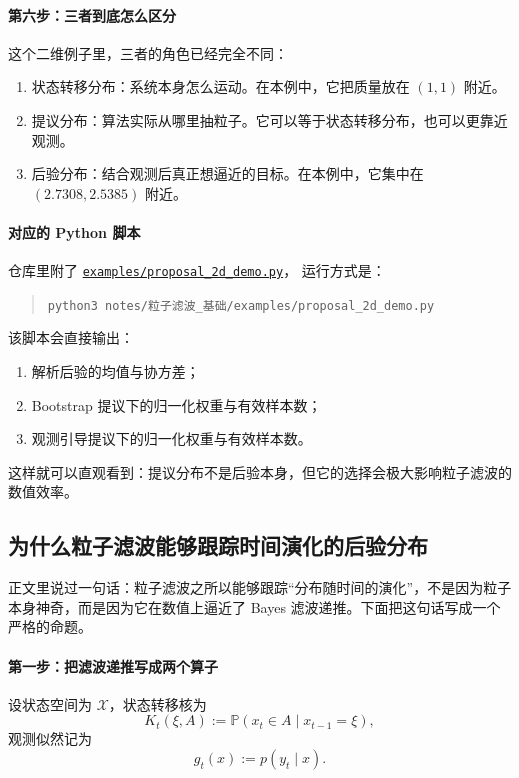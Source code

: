 \documentclass[12pt,a4paper]{ctexart}
\begin{document}
\paragraph{第六步：三者到底怎么区分}
这个二维例子里，三者的角色已经完全不同：
\begin{enumerate}
  \item 状态转移分布：系统本身怎么运动。在本例中，它把质量放在 \((1,1)\) 附近。
  \item 提议分布：算法实际从哪里抽粒子。它可以等于状态转移分布，也可以更靠近观测。
  \item 后验分布：结合观测后真正想逼近的目标。在本例中，它集中在 \((2.7308,2.5385)\) 附近。
\end{enumerate}

\paragraph{对应的 Python 脚本}
仓库里附了
\href{run:examples/proposal_2d_demo.py}{\nolinkurl{examples/proposal_2d_demo.py}}，
运行方式是：
\begin{quote}
\nolinkurl{python3 notes/粒子滤波_基础/examples/proposal_2d_demo.py}
\end{quote}
该脚本会直接输出：
\begin{enumerate}
  \item 解析后验的均值与协方差；
  \item Bootstrap 提议下的归一化权重与有效样本数；
  \item 观测引导提议下的归一化权重与有效样本数。
\end{enumerate}
这样就可以直观看到：提议分布不是后验本身，但它的选择会极大影响粒子滤波的数值效率。

\subsection{为什么粒子滤波能够跟踪时间演化的后验分布}\label{app:bayes-recursion}

正文里说过一句话：粒子滤波之所以能够跟踪“分布随时间的演化”，不是因为粒子本身神奇，而是因为它在数值上逼近了 Bayes 滤波递推。下面把这句话写成一个严格的命题。

\paragraph{第一步：把滤波递推写成两个算子}
设状态空间为 \(\mathcal X\)，状态转移核为
\[
K_t(\xi, A) := \mathbb P(x_t \in A \mid x_{t-1}=\xi),
\]
观测似然记为
\[
g_t(x) := p(y_t \mid x).
\]
\end{document}
